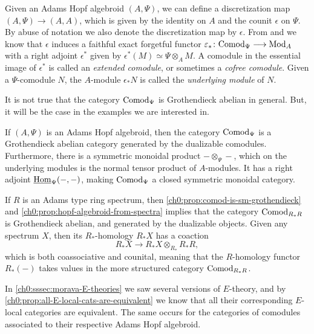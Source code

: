 \begin{construction}
    \label{ch0:const:discretization-adjunction}
    Given an Adams Hopf algebroid $(A, \Psi)$, we can define a discretization map $(A, \Psi)\longrightarrow (A, A)$, which is given by the identity on $A$ and the counit $\epsilon$ on $\Psi$. By abuse of notation we also denote the discretization map by $\epsilon$. From \cite[A1.2.1]{ravenel_86} and \cite[4.6]{barthel-heard-valenzuela_2018} we know that $\epsilon$ induces a faithful exact forgetful functor $\varepsilon_* \colon \mathrm{Comod}_\Psi \longrightarrow \mathrm{Mod}_A$ with a right adjoint $\epsilon^*$ given by $\epsilon^*(M)\simeq \Psi\otimes_A M$. A comodule in the essential image of $\epsilon^*$ is called an \emph{extended comodule}, or sometimes a \emph{cofree comodule}. Given a $\Psi$-comodule $N$, the $A$-module $\epsilon_* N$ is called the \emph{underlying module} of $N$.  
\end{construction}

It is not true that the category $\mathrm{Comod}_\Psi$ is Grothendieck abelian in general. But, it will be the case in the examples we are interested in. 

\begin{proposition}
    \label{ch0:prop:comod-is-sm-grothendieck}
    If $(A,\Psi)$ is an Adams Hopf algebroid, then the category $\mathrm{Comod}_\Psi$ is a Grothendieck abelian category generated by the dualizable comodules. Furthermore, there is a symmetric monoidal product $-\otimes_\Psi -$, which on the underlying modules is the normal tensor product of $A$-modules. It has a right adjoint $\operatorname{\underline{Hom}}_\Psi(-,-)$, making $\mathrm{Comod}_\Psi$ a closed symmetric monoidal category. 
\end{proposition}

\begin{example}
    If $R$ is an Adams type ring spectrum, then \cref{ch0:prop:comod-is-sm-grothendieck} and \cref{ch0:prop:hopf-algebroid-from-spectra} implies that the category $\mathrm{Comod}_{R_*R}$ is Grothendieck abelian, and generated by the dualizable objects. Given any spectrum $X$, then its $R_*$-homology $R_*X$ has a coaction 
    \[R_*X \to R_*X \otimes_{R_*} R_*R,\]
    which is both coassociative and counital, meaning that the $R$-homology functor $R_*(-)$ takes values in the more structured category $\mathrm{Comod}_{R_*R}$. 
\end{example}

In \cref{ch0:sssec:morava-E-theories} we saw several versions of $E$-theory, and by \cref{ch0:prop:all-E-local-cats-are-equivalent} we know that all their corresponding $E$-local categories are equivalent. The same occurs for the categories of comodules associated to their respective Adams Hopf algebroid.

